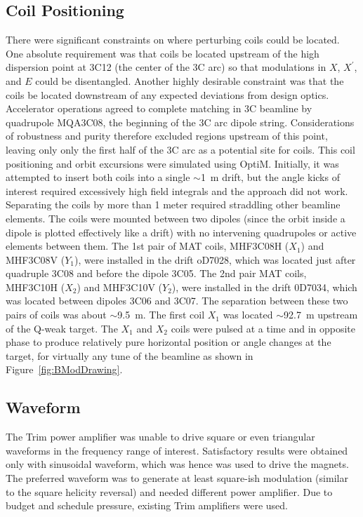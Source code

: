 \subsection{Coil Positioning}
\label{Coil Positioning}
There were significant constraints on where perturbing coils could be located. One absolute requirement was that coils be located upstream of the high dispersion point at 3C12 (the center of the 3C arc) so that modulations in $X$, $X^{\prime}$, and $E$ could be disentangled. Another highly desirable constraint was that the coils be located downstream of any expected deviations from design optics. Accelerator operations agreed to complete matching in 3C beamline by quadrupole MQA3C08, the beginning of the 3C arc dipole string. Considerations of robustness and purity therefore excluded regions upstream of this point, leaving only only the first half of the 3C arc as a potential site for coils. 
This coil positioning and orbit excursions were simulated using OptiM. Initially, it was attempted to insert both coils into a single $\sim$1~m drift, but the angle kicks of interest required excessively high field integrals and the approach did not work. Separating the coils by more than 1 meter required straddling other beamline elements. The coils were mounted between two dipoles (since the orbit inside a dipole is plotted effectively like a drift) with no intervening quadrupoles or active elements between them. The 1st pair of MAT coils, MHF3C08H ($X_{1}$) and MHF3C08V ($Y_{1}$), were installed in the drift oD7028, which was located just after quadruple 3C08 and before the dipole 3C05. The 2nd pair MAT coils, MHF3C10H ($X_{2}$) and MHF3C10V ($Y_{2}$), were installed in the drift 0D7034, which was located between dipoles 3C06 and 3C07. The separation between these two pairs of coils was about $\sim$9.5~m. The first coil $X_{1}$ was located $\sim$92.7~m upstream of the Q-weak target.  %
The $X_{1}$ and $X_{2}$ coils were pulsed at a time and in opposite phase to produce relatively pure horizontal position or angle changes at the target, for virtually any tune of the beamline as shown in Figure~\ref{fig:BModDrawing}.

\subsection{Waveform}
\label{Waveform}
The Trim power amplifier was unable to drive square or even triangular waveforms in the frequency range of interest. Satisfactory results were obtained only with sinusoidal waveform, which was hence was used to drive the magnets. The preferred waveform was to generate at least square-ish modulation (similar to the square helicity reversal) and needed different power amplifier. Due to budget and schedule pressure, existing Trim amplifiers were used.

